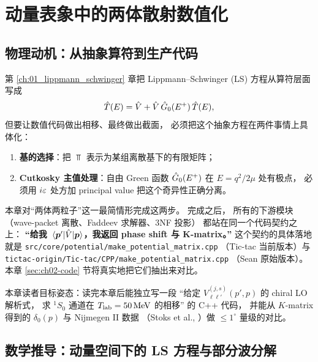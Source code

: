 
\chapter{动量表象中的两体散射数值化}
\label{ch:02_two_body_numerics}

\section{物理动机：从抽象算符到生产代码}
\label{sec:ch02-motivation}

第 \ref{ch:01_lippmann_schwinger} 章把 Lippmann--Schwinger (LS) 方程从算符层面写成
\begin{equation}
  \hat{T}(E) = \hat{V} + \hat{V}\, \hat{G}_0(E^+)\, \hat{T}(E),
  \label{eq:ch02-LS-recall}
\end{equation}
但要让数值代码做出相移、最终做出截面，
必须把这个抽象方程在两件事情上具体化：
\begin{enumerate}
  \item \textbf{基的选择}：把 $\Top$ 表示为某组离散基下的有限矩阵；
  \item \textbf{Cutkosky 主值处理}：自由 Green 函数 $\hat{G}_0(E^+)$ 在 $E = q^2/2\mu$ 处有极点，
        必须用 $i\varepsilon$ 处方加 principal value 把这个奇异性正确分离。
\end{enumerate}
本章对“两体两粒子”这一最简情形完成这两步。
完成之后，
所有的下游模块（wave-packet 离散、Faddeev 求解器、3NF 投影）
都站在同一个代码契约之上：
\textbf{“给我 $\matrixel{\bvec{p}'}{\Vop}{\bvec{p}}$，我返回 phase shift 与 K-matrix。”}
这个契约的具体落地就是 \texttt{src/core/potential/make\_potential\_matrix.cpp}
（Tic-tac 当前版本）与 \texttt{tictac-origin/Tic-tac/CPP/make\_potential\_matrix.cpp}
（Sean 原始版本）。
本章 \cref{sec:ch02-code} 节将真实地把它们抽出来对比。

本章读者目标姿态：读完本章后能独立写一段
“给定 $V_{\ell\ell'}^{(j,s)}(p', p)$ 的 chiral LO 解析式，
求 $^1S_0$ 通道在 ${T_{\text{lab}}} = \SI{50}{MeV}$ 的相移”
的 C++ 代码，
并能从 $K$-matrix 得到的 $\delta_0(p)$ 与 Nijmegen II 数据
（Stoks et al., \cite{NijmegenII}）做 $\le 1^{\circ}$ 量级的对比。

\section{数学推导：动量空间下的 LS 方程与部分波分解}
\label{sec:ch02-math}


